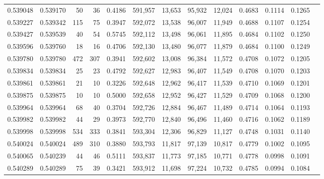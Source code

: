 \begin{tabular}{rrrrrrrrrrrrr}
0.539048 & 0.539170 &    50 &    36 &                                     0.4186 & 591,957 &  13,653 &  95,932 &  12,024 & 0.4683 & 0.1114 & 0.1265 \\
0.539227 & 0.539342 &   115 &    75 &                                     0.3947 & 592,072 &  13,538 &  96,007 &  11,949 & 0.4688 & 0.1107 & 0.1254 \\
0.539427 & 0.539539 &    40 &    54 &                                     0.5745 & 592,112 &  13,498 &  96,061 &  11,895 & 0.4684 & 0.1102 & 0.1250 \\
0.539596 & 0.539760 &    18 &    16 &                                     0.4706 & 592,130 &  13,480 &  96,077 &  11,879 & 0.4684 & 0.1100 & 0.1249 \\
0.539780 & 0.539780 &   472 &   307 &                                     0.3941 & 592,602 &  13,008 &  96,384 &  11,572 & 0.4708 & 0.1072 & 0.1205 \\
0.539834 & 0.539834 &    25 &    23 &                                     0.4792 & 592,627 &  12,983 &  96,407 &  11,549 & 0.4708 & 0.1070 & 0.1203 \\
0.539861 & 0.539861 &    21 &    10 &                                     0.3226 & 592,648 &  12,962 &  96,417 &  11,539 & 0.4710 & 0.1069 & 0.1201 \\
0.539875 & 0.539875 &    10 &    10 &                                     0.5000 & 592,658 &  12,952 &  96,427 &  11,529 & 0.4709 & 0.1068 & 0.1200 \\
0.539964 & 0.539964 &    68 &    40 &                                     0.3704 & 592,726 &  12,884 &  96,467 &  11,489 & 0.4714 & 0.1064 & 0.1193 \\
0.539982 & 0.539982 &    44 &    29 &                                     0.3973 & 592,770 &  12,840 &  96,496 &  11,460 & 0.4716 & 0.1062 & 0.1189 \\
0.539998 & 0.539998 &   534 &   333 &                                     0.3841 & 593,304 &  12,306 &  96,829 &  11,127 & 0.4748 & 0.1031 & 0.1140 \\
0.540024 & 0.540024 &   489 &   310 &                                     0.3880 & 593,793 &  11,817 &  97,139 &  10,817 & 0.4779 & 0.1002 & 0.1095 \\
0.540065 & 0.540239 &    44 &    46 &                                     0.5111 & 593,837 &  11,773 &  97,185 &  10,771 & 0.4778 & 0.0998 & 0.1091 \\
0.540289 & 0.540289 &    75 &    39 &                                     0.3421 & 593,912 &  11,698 &  97,224 &  10,732 & 0.4785 & 0.0994 & 0.1084 \\

\end{tabular}
